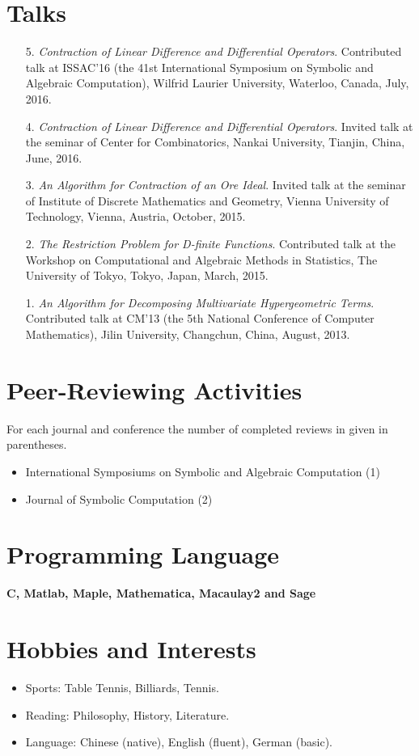\documentclass[a4paper,12pt]{article}
\begin{document}
\section*{\Large{Talks}}
\begin{itemize}
 \item[5.] {\em Contraction of Linear Difference and Differential Operators}. Contributed talk at ISSAC'16 
 (the 41st International Symposium on Symbolic and Algebraic Computation), Wilfrid Laurier University, Waterloo, Canada, July, 2016.
 \item[4.] {\em Contraction of Linear Difference and Differential Operators}.
       Invited talk at the seminar of Center for Combinatorics, Nankai University, Tianjin, China, June, 2016.
 \item[3.] {\em An Algorithm for Contraction of an Ore Ideal}. Invited talk at the seminar of Institute of Discrete Mathematics and Geometry, 
       Vienna University of Technology, Vienna, Austria, October, 2015.
 \item[2.] {\em The Restriction Problem for D-finite Functions}. 
       Contributed talk at the Workshop on Computational and Algebraic Methods in Statistics,
       The University of Tokyo, Tokyo, Japan, March, 2015.
 \item[1.] {\em An Algorithm for Decomposing Multivariate Hypergeometric Terms}. Contributed talk at CM'13
       (the 5th National Conference of Computer Mathematics), Jilin University, Changchun, China, August, 2013.
\end{itemize}

\section*{\Large Peer-Reviewing Activities}
For each journal and conference the number of completed reviews in given in parentheses.
\begin{itemize}
 \item International Symposiums on Symbolic and Algebraic Computation (1)
 \item Journal of Symbolic Computation (2)
\end{itemize}

\section*{\Large{Programming Language}}
\vspace{.05in}
{\bf C, Matlab, Maple, Mathematica, Macaulay2 and Sage}

\section*{\Large{Hobbies and Interests}}
\begin{itemize}
 \item Sports: Table Tennis, Billiards, Tennis.
 \item Reading: Philosophy, History, Literature.
 \item Language: Chinese (native), English (fluent), German (basic).
\end{itemize}
\end{document}
